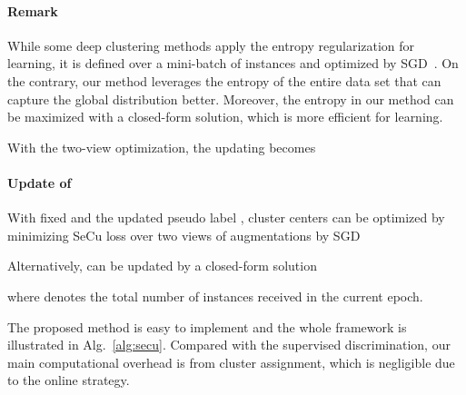 \documentclass[10pt,twocolumn,letterpaper]{article}
\begin{document}
\paragraph{Remark} While some deep clustering methods apply the entropy regularization for learning, it is defined over a mini-batch of instances and optimized by SGD~\cite{GansbekeVGPG20}. On the contrary, our method leverages the entropy of the entire data set that can capture the global distribution better. Moreover, the entropy in our method can be maximized with a closed-form solution, which is more efficient for learning.

With the two-view optimization, the updating becomes



\paragraph{Update of } With fixed  and the updated pseudo label , cluster centers can be optimized by minimizing SeCu loss over two views of augmentations by SGD

Alternatively,  can be updated by a closed-form solution

where  denotes the total number of instances received in the current epoch.

The proposed method is easy to implement and the whole framework is illustrated in Alg.~\ref{alg:secu}. Compared with the supervised discrimination, our main computational overhead is from cluster assignment, which is negligible due to the online strategy.
\end{document}
